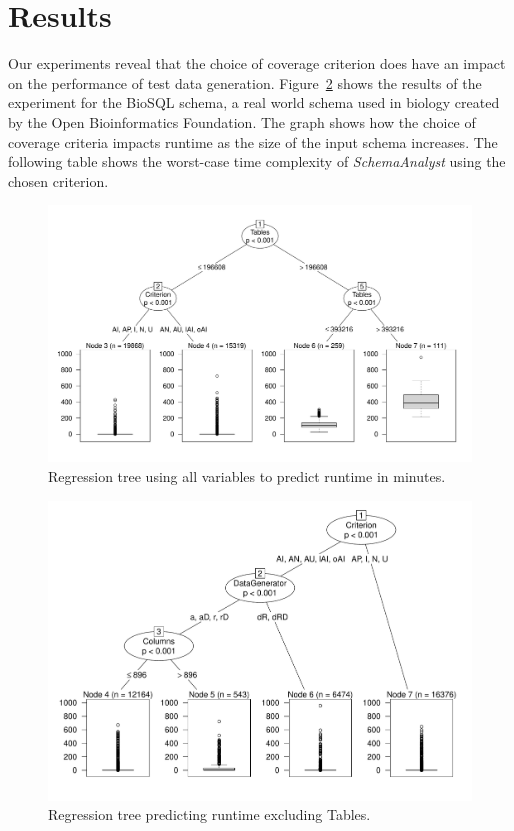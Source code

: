 \section{Results}
  \label{sec:results}

Our experiments reveal that the choice of coverage criterion does have an impact
on the performance of test data generation. 
Figure~\ref{fig:crites} shows the results of the experiment for the BioSQL
schema, a real world schema used in biology created by the
Open Bioinformatics Foundation.
The graph shows how the choice of coverage criteria impacts
runtime as the size of the input schema increases. The following table shows
the worst-case time complexity of \textit{SchemaAnalyst} using the
chosen criterion.

\begin{figure}
\centering
  \centering
  \includegraphics[width=.75\linewidth]{../diagrams/AllTree.pdf}
  \caption{Regression tree using all variables to predict runtime in
  minutes. \vspace{-.15in}}
  \label{fig:crites}
  \vspace{-.15in} 
\end{figure}

\begin{figure}
\centering
  \centering
  \includegraphics[width=.75\linewidth]{../diagrams/NoTableCtreesd.pdf}
  \caption{Regression tree predicting runtime excluding Tables.\vspace{-.15in}}
  \label{fig:crites}
  \vspace{-.15in} 
\end{figure}


